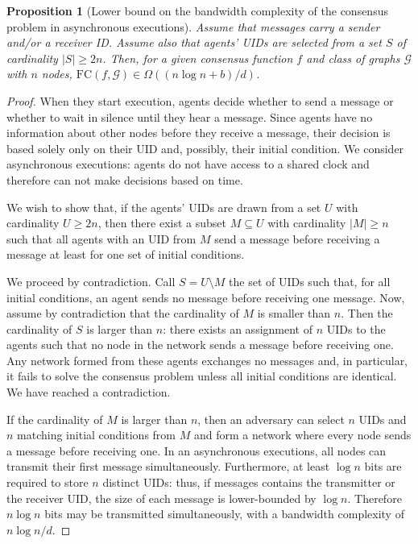 \documentclass[letterpaper,10pt,conference]{ieeeconf}
\newtheorem{proposition}[theorem]{Proposition}
\begin{document}
\begin{proposition}[Lower bound on the bandwidth complexity of the consensus problem in asynchronous executions]
\label{prop:asynclb}
Assume that messages carry a sender and/or a receiver ID. Assume also that agents' UIDs are selected from a set $S$ of cardinality $|S|\geq 2n$.  Then, for a given consensus function $f$ and class of graphs $\mathcal G$ with $n$ nodes,  $\textrm{FC}(f, \mathcal G) \in \Omega((n\log n +b)/d)$.
\end{proposition}
\begin{proof}

When they start execution, agents decide whether to send a message or whether to wait in silence until they hear a message. Since agents have no information about other nodes before they receive a message, their decision is based solely only on their UID and, possibly, their initial condition. We consider asynchronous executions: agents do not have access to a shared clock and therefore can not make decisions based on time.

We wish to show that, if the agents' UIDs are drawn from a set $U$ with cardinality $U\geq 2n$, then there exist a subset $M\subseteq U$ with cardinality $|M|\geq n$ such that all agents with an UID from $M$ send a message before receiving a message at least for one set of initial conditions.

We proceed by contradiction. Call $S=U\setminus M$ the set of UIDs such that, for all initial conditions, an agent sends no message before receiving one message. Now, assume by contradiction that the cardinality of $M$ is smaller than $n$. Then the cardinality of $S$ is larger than $n$: there exists an assignment of $n$ UIDs to the agents such that no node in the network sends a message before receiving one. Any network formed from these agents exchanges no messages and, in particular, it fails to solve the consensus problem unless all initial conditions are identical. We have reached a contradiction.

If the cardinality of $M$ is larger than $n$, then an adversary can select $n$ UIDs and $n$ matching initial conditions from $M$ and form a network where every node sends a message before receiving one. In an asynchronous executions, all nodes can transmit their first message simultaneously. Furthermore, at least $\log n$ bits are required to store $n$ distinct UIDs: thus, if messages contains the transmitter or the receiver UID, the size of each message is lower-bounded by $\log n$. Therefore $n\log n$ bits may be transmitted simultaneously, with a bandwidth complexity of $n\log n/d$. 


\end{proof}
\end{document}
